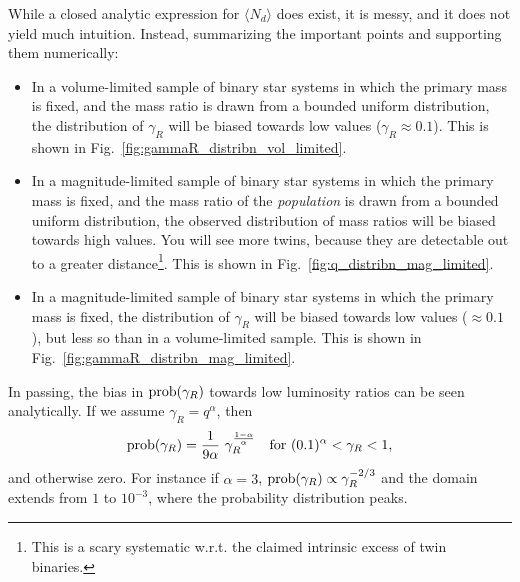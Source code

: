 \documentclass{emulateapj}
\begin{document}
While a closed analytic expression for $\langle N_d \rangle$ does exist, it is 
messy, and it does not yield much intuition. Instead, summarizing the important 
points and supporting them numerically:
\begin{itemize}
	\item In a volume-limited sample of binary star systems in which the 
	primary mass is fixed, and the mass ratio is drawn from a bounded uniform 
	distribution, the distribution of $\gamma_R$ will be biased towards low 
	values ($\gamma_R \approx 0.1$). This is shown in 
	Fig.~\ref{fig:gammaR_distribn_vol_limited}.
	\item In a magnitude-limited sample of binary star systems in which the 
	primary mass is fixed, and the mass ratio of the \textit{population} is 
	drawn from a bounded uniform distribution, the observed distribution of 
	mass ratios will be biased towards high values. You will see more twins,
	because they are detectable out to a greater distance\footnote{This is a 
	scary systematic w.r.t. the claimed intrinsic excess of twin binaries.}. 
	This is shown in 
	Fig.~\ref{fig:q_distribn_mag_limited}.
	\item In a magnitude-limited sample of binary star systems in which the 
	primary mass is fixed, the distribution of $\gamma_R$ will be biased 
	towards low values ($\approx 0.1$), but less so than in a 
	volume-limited sample. This is shown in 
	Fig.~\ref{fig:gammaR_distribn_mag_limited}.
\end{itemize}

In passing, the bias in ${\rm prob}(\gamma_R)$ towards low luminosity ratios 
can be seen analytically. If we assume $\gamma_R = q^\alpha$, then
\begin{equation}
{\rm prob}(\gamma_R) = \frac{1}{9 \alpha} \ \gamma_R^{\frac{1-\alpha}{\alpha}}
\quad {\rm for\ } (0.1)^\alpha < \gamma_R < 1,
\end{equation}
and otherwise zero. For instance if $\alpha = 3$, ${\rm prob}(\gamma_R) 
\propto \gamma_R^{-2/3}$ and the domain extends from $1$ to 
$10^{-3}$, where the probability distribution peaks.
\end{document}
